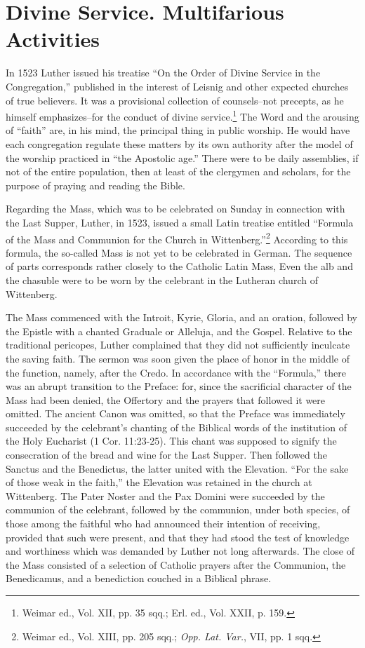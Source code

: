 \section{Divine Service. Multifarious Activities}

In 1523 Luther issued his treatise “On the Order of Divine Service
in the Congregation,” published in the interest of Leisnig and other
expected churches of true believers. It was a provisional collection
of counsels--not precepts, as he himself emphasizes--for the conduct of
divine service.\footnote{Weimar ed., Vol. XII, pp. 35 sqq.; Erl. ed., Vol. XXII, p. 159.}
The Word and the arousing of “faith” are,
in his mind, the principal thing in public worship. He would have
each congregation regulate these matters by its own authority after
the model of the worship practiced in “the Apostolic age.” There
were to be daily assemblies, if not of the entire population, then at
least of the clergymen and scholars, for the purpose of praying and
reading the Bible.

Regarding the Mass, which was to be celebrated on Sunday in
connection with the Last Supper, Luther, in 1523, issued a small
Latin treatise entitled “Formula of the Mass and Communion for
the Church in Wittenberg.”\footnote{Weimar ed., Vol. XIII, pp. 205 sqq.; \textit{Opp. Lat. Var.}, VII, pp. 1 sqq.}
According to this formula, the so-called
Mass is not yet to be celebrated in German. The sequence
of parts corresponds rather closely to the Catholic Latin Mass, Even
the alb and the chasuble were to be worn by the celebrant in the
Lutheran church of Wittenberg.

The Mass commenced with the Introit, Kyrie, Gloria, and an oration,
followed by the Epistle with a chanted Graduale or Alleluja, and the Gospel.
Relative to the traditional pericopes, Luther complained that they did not
sufficiently inculcate the saving faith. The sermon was soon given the place
of honor in the middle of the function, namely, after the Credo. In accordance
with the “Formula,” there was an abrupt transition to the Preface: for,
since the sacrificial character of the Mass had been denied, the Offertory and
the prayers that followed it were omitted. The ancient Canon was omitted,
so that the Preface was immediately succeeded by the celebrant’s chanting
of the Biblical words of the institution of the Holy Eucharist (1 Cor. 11:23-25).
This chant was supposed to signify the consecration of the bread
and wine for the Last Supper. Then followed the Sanctus and the Benedictus,
the latter united with the Elevation. “For the sake of those weak in the
faith,” the Elevation was retained in the church at Wittenberg. The Pater
Noster and the Pax Domini were succeeded by the communion of the celebrant,
followed by the communion, under both species, of those among the
faithful who had announced their intention of receiving, provided that such
were present, and that they had stood the test of knowledge and worthiness
which was demanded by Luther not long afterwards. The close of the Mass
consisted of a selection of Catholic prayers after the Communion, the
Benedicamus, and a benediction couched in a Biblical phrase.


